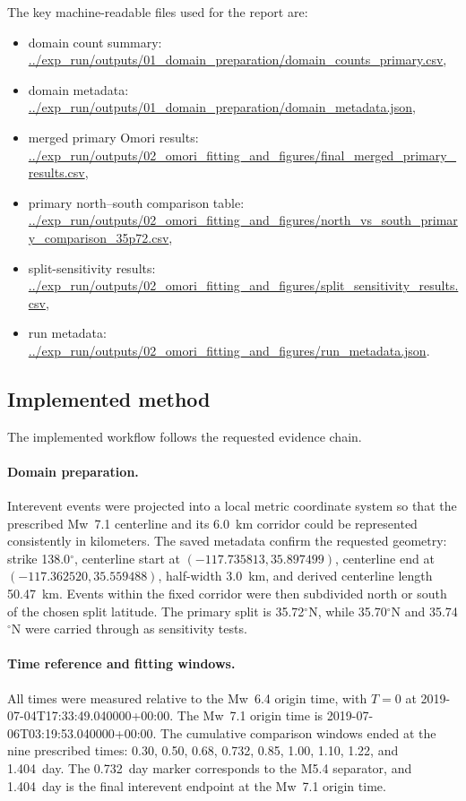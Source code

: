 \documentclass[11pt]{article}
\begin{document}
The key machine-readable files used for the report are:
\begin{itemize}[leftmargin=2em]
    \item domain count summary: \url{../exp_run/outputs/01_domain_preparation/domain_counts_primary.csv},
    \item domain metadata: \url{../exp_run/outputs/01_domain_preparation/domain_metadata.json},
    \item merged primary Omori results: \url{../exp_run/outputs/02_omori_fitting_and_figures/final_merged_primary_results.csv},
    \item primary north--south comparison table: \url{../exp_run/outputs/02_omori_fitting_and_figures/north_vs_south_primary_comparison_35p72.csv},
    \item split-sensitivity results: \url{../exp_run/outputs/02_omori_fitting_and_figures/split_sensitivity_results.csv},
    \item run metadata: \url{../exp_run/outputs/02_omori_fitting_and_figures/run_metadata.json}.
\end{itemize}

\subsection{Implemented method}
The implemented workflow follows the requested evidence chain.

\paragraph{Domain preparation.}
Interevent events were projected into a local metric coordinate system so that the prescribed Mw~7.1 centerline and its 6.0~km corridor could be represented consistently in kilometers. The saved metadata confirm the requested geometry: strike 138.0$^{\circ}$, centerline start at $(-117.735813,35.897499)$, centerline end at $(-117.362520,35.559488)$, half-width 3.0~km, and derived centerline length 50.47~km. Events within the fixed corridor were then subdivided north or south of the chosen split latitude. The primary split is 35.72$^{\circ}$N, while 35.70$^{\circ}$N and 35.74$^{\circ}$N were carried through as sensitivity tests.

\paragraph{Time reference and fitting windows.}
All times were measured relative to the Mw~6.4 origin time, with $T=0$ at 2019-07-04T17:33:49.040000+00:00. The Mw~7.1 origin time is 2019-07-06T03:19:53.040000+00:00. The cumulative comparison windows ended at the nine prescribed times: 0.30, 0.50, 0.68, 0.732, 0.85, 1.00, 1.10, 1.22, and 1.404~day. The 0.732~day marker corresponds to the M5.4 separator, and 1.404~day is the final interevent endpoint at the Mw~7.1 origin time.
\end{document}
